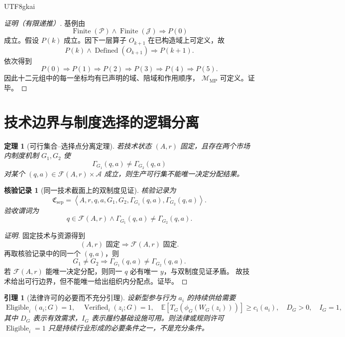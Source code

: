 \documentclass[12pt,a4paper,openany]{report}
\newtheorem{theorem}{定理}[chapter]
\newtheorem{lemma}{引理}[chapter]
\newtheorem{Certificate}{核验记录}[chapter]
\newcommand{\EE}{\mathbb E}
\newcommand{\Mech}{\mathcal M}
\newcommand{\Feas}{\mathcal F}
\newcommand{\Part}{\mathcal P}
\newcommand{\Act}{\mathcal A}
\newcommand{\Goods}{\mathcal J}
\newcommand{\Tuple}[1]{\left\langle #1\right\rangle}
\DeclareMathOperator{\Eligible}{Eligible}
\DeclareMathOperator{\Verified}{Verified}
\begin{document}
\begin{CJK*}{UTF8}{gkai}
\begin{proof}[证明（有限递推）]
基例由
\[
  \operatorname{Finite}(\Part)\wedge\operatorname{Finite}(\Goods)
  \Longrightarrow P(0)
\]
成立。假设 \(P(k)\) 成立。因下一层算子 \(O_{k+1}\) 在已构造域上可定义，故
\[
  P(k)\wedge\operatorname{Defined}(O_{k+1})
  \Longrightarrow P(k+1).
\]
依次得到
\[
  P(0)\Longrightarrow P(1)\Longrightarrow P(2)
  \Longrightarrow P(3)\Longrightarrow P(4)\Longrightarrow P(5).
\]
因此十二元组中的每一坐标均有已声明的域、陪域和作用顺序，
\(\Mech_{\mathrm{MP}}\) 可定义。证毕。
\end{proof}

\section{技术边界与制度选择的逻辑分离}

\begin{theorem}[可行集合--选择点分离定理]
\label{thm:feasible-selection-separation}
若技术状态 \((A,r)\) 固定，且存在两个市场内制度机制 \(G_1,G_2\) 使
\[
  \Gamma_{G_1}(q,a)\ne\Gamma_{G_2}(q,a)
\]
对某个 \((q,a)\in\Feas(A,r)\times\Act\) 成立，则生产可行集不能唯一决定分配结果。
\end{theorem}

\begin{Certificate}[同一技术截面上的双制度见证]
核验记录为
\[
  \mathfrak C_{\mathrm{sep}}
  =\Tuple{A,r,q,a,G_1,G_2,
  \Gamma_{G_1}(q,a),\Gamma_{G_2}(q,a)}.
\]
验收谓词为
\[
  q\in\Feas(A,r)
  \wedge
  \Gamma_{G_1}(q,a)\ne\Gamma_{G_2}(q,a).
\]
\end{Certificate}

\begin{proof}[证明]
固定技术与资源得到
\[
  (A,r)\text{ 固定}
  \Longrightarrow
  \Feas(A,r)\text{ 固定}.
\]
再取核验记录中的同一个 \((q,a)\)，则
\[
  G_1\ne G_2
  \Longrightarrow
  \Gamma_{G_1}(q,a)\ne\Gamma_{G_2}(q,a).
\]
若 \(\Feas(A,r)\) 能唯一决定分配，则同一 \(q\) 必有唯一 \(y\)，与双制度见证矛盾。
故技术给出可行边界，但不能唯一给出组织内分配点。证毕。
\end{proof}

\begin{lemma}[法律许可的必要而不充分引理]
\label{lem:permission-not-sufficient}
设新型参与行为 \(a_i\) 的持续供给需要
\[
  \Eligible_i(a_i;G)=1,\quad
  \Verified_i(z_i;G)=1,\quad
  \EE[T_G(\phi_G(W_G(z_i)))]\ge c_i(a_i),\quad
  D_G>0,\quad I_G=1,
\]
其中 \(D_G\) 表示有效需求，\(I_G\) 表示履约基础设施可用。则法律或规则许可
\(\Eligible_i=1\) 只是持续行业形成的必要条件之一，不是充分条件。
\end{lemma}


\end{CJK*}
\end{document}

